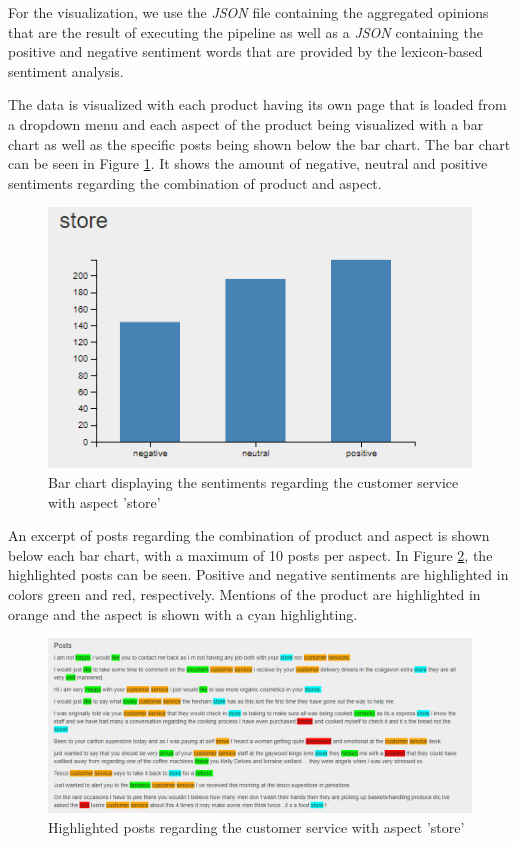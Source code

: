 \documentclass[10pt,a4paper]{article}
\begin{document}
		For the visualization, we use the \textit{JSON} file containing the aggregated opinions that are the result of executing the pipeline as well as a \textit{JSON} containing the positive and negative sentiment words that are provided by the lexicon-based sentiment analysis.
	
		The data is visualized with each product having its own page that is loaded from a dropdown menu and each aspect of the product being visualized with a bar chart as well as the specific posts being shown below the bar chart. The bar chart can be seen in Figure \ref{fig:barchart}. It shows the amount of negative, neutral and positive sentiments regarding the combination of product and aspect.
	
		\begin{figure}[h]
			\centering
			\includegraphics[width=0.7\linewidth]{data/barchart}
			\caption{Bar chart displaying the sentiments regarding the customer service with aspect 'store'}
			\label{fig:barchart}
		\end{figure}
			
		An excerpt of posts regarding the combination of product and aspect is shown below each bar chart, with a maximum of 10 posts per aspect. In Figure \ref{fig:posts}, the highlighted posts can be seen. Positive and negative sentiments are highlighted in colors green and red, respectively. Mentions of the product are highlighted in orange and the aspect is shown with a cyan highlighting.
			
		\begin{figure}[h]
			\centering
			\includegraphics[width=0.9\linewidth]{data/posts}
			\caption{Highlighted posts regarding the customer service with aspect 'store'}
			\label{fig:posts}
		\end{figure}
	
\end{document}
